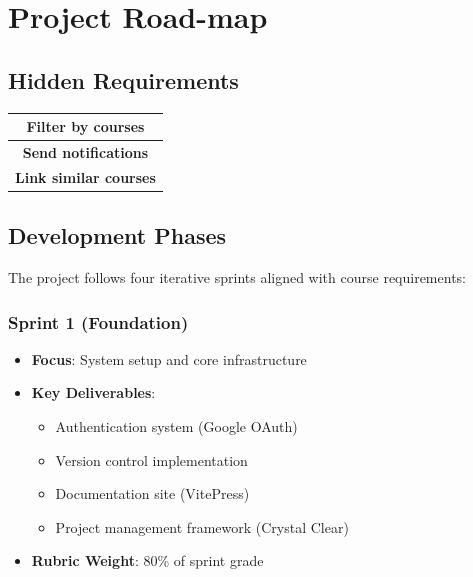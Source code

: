 \chapter{Project Road-map}

\section{Hidden Requirements}

\begin{center} %
\begin{tabular}{|c|} %
\hline
\textbf{Filter by courses} \\
\hline
\textbf{Send notifications} \\
\hline
\textbf{Link similar courses} \\
\hline
\end{tabular}
\end{center}



\section{Development Phases}
The project follows four iterative sprints aligned with course requirements:

\subsection{Sprint 1 (Foundation)}
\begin{itemize}
    \item \textbf{Focus}: System setup and core infrastructure
    \item \textbf{Key Deliverables}:
        \begin{itemize}
            \item Authentication system (Google OAuth)
            \item Version control implementation
            \item Documentation site (VitePress)
            \item Project management framework (Crystal Clear)
        \end{itemize}
    \item \textbf{Rubric Weight}: 80\% of sprint grade
\end{itemize}

